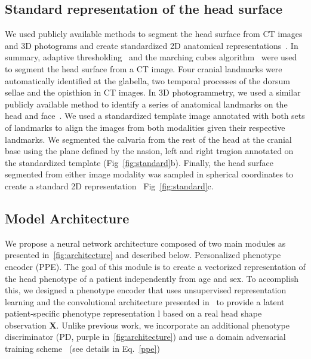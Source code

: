 \documentclass[conference]{IEEEtran}
\begin{document}
\subsection{Standard representation of the head surface}
We used publicly available methods to segment the head surface from CT images and 3D photograms and create standardized 2D anatomical representations~\cite{Porras2022Predictive}. In summary, adaptive thresholding~\cite{Liu2022Data-driven} and the marching cubes algorithm~\cite{Lorensen1987Marching} were used to segment the head surface from a CT image. Four cranial landmarks were automatically identified at the glabella, two temporal processes of the dorsum sellae and the opisthion in CT images. In 3D photogrammetry, we used a similar publicly available method to identify a series of anatomical landmarks on the head and face~\cite{Elkhill2023Geometric}. We used a standardized template image annotated with both sets of landmarks to align the images from both modalities given their respective landmarks. We segmented the calvaria from the rest of the head at the cranial base using the plane defined by the nasion, left and right tragion annotated on the standardized template (Fig~\ref{fig:standard}b). Finally, the head surface segmented from either image modality was sampled in spherical coordinates to create a standard 2D representation~\cite{Porras2022Predictive} Fig~\ref{fig:standard}c.
\vspace{-1mm}
\subsection{Model Architecture}
We propose a neural network architecture composed of two main modules as presented in~\ref{fig:architecture} and described below.
Personalized phenotype encoder (PPE). The goal of this module is to create a vectorized representation of the head phenotype of a patient independently from age and sex. To accomplish this, we designed a phenotype encoder that uses unsupervised representation learning and the convolutional architecture presented in~\cite{Radford2016Unsupervised} to provide a latent patient-specific phenotype representation l based on a real head shape observation \textbf{X}. Unlike previous work, we incorporate an additional phenotype discriminator (PD, purple in~\ref{fig:architecture}) and use a domain adversarial training scheme~\cite{Ganin2016Domain-Adversarial} (see details in Eq.~\ref{ppe})
\end{document}
